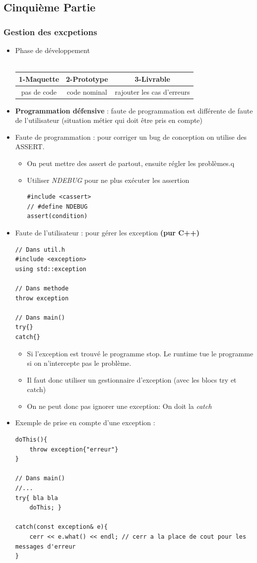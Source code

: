 \documentclass[12pt,a4paper]{article}
\begin{document}
\subsection{Cinquième Partie}
\subsubsection{Gestion des excpetions}
\begin{itemize}
\item Phase de développement \\\\
\begin{tabular}{|c|c|c|}
  \hline
  1-Maquette & 2-Prototype & 3-Livrable \\ \hline
  pas de code & code nominal & rajouter les cas d'erreurs\\\hline
\end{tabular}
\item \textbf{Programmation défensive} : faute de programmation est différente de faute de l'utilisateur (situation métier qui doit être pris en compte)
\item Faute de programmation : pour corriger un bug de conception on utilise des ASSERT.
\begin{itemize}
\item On peut mettre des assert de partout, ensuite régler les problèmes.q
\item Utiliser \textit{NDEBUG} pour ne plus exécuter les assertion
\begin{lstlisting}
#include <cassert>
// #define NDEBUG
assert(condition)
\end{lstlisting}
\end{itemize}
\item Faute de l'utilisateur : pour gérer les exception \textbf{(pur C++)}
\begin{lstlisting}
// Dans util.h
#include <exception>
using std::exception

// Dans methode
throw exception

// Dans main()
try{}
catch{}
\end{lstlisting}
\begin{itemize}
\item Si l'exception est trouvé le programme stop. Le runtime tue le programme si on n'intercepte pas le problème.
\item Il faut donc utiliser un gestionnaire d'exception (avec les blocs try et catch)
\item On ne peut donc pas ignorer une exception: On doit la  \textit{catch{}}
\end{itemize}
\item Exemple de prise en compte d'une exception :
\begin{lstlisting}
doThis(){
	throw exception{"erreur"}
}

// Dans main()
//...
try{ bla bla
	doThis; }

catch(const exception& e){
	cerr << e.what() << endl; // cerr a la place de cout pour les messages d'erreur
}
\end{lstlisting}
\end{itemize}
\end{document}
